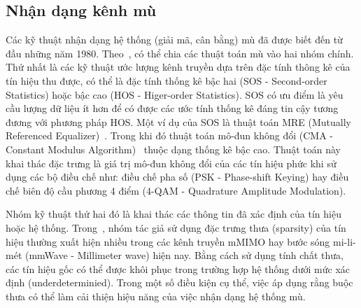\subsection{Nhận dạng kênh mù} \label{sec:blind}

Các kỹ thuật nhận dạng hệ thống (giải mã, cân bằng) mù đã được biết đến từ đầu những năm 1980. Theo~\cite{vilas2022}, có thể chia các thuật toán mù vào hai nhóm chính. Thứ nhất là các kỹ thuật ước lượng kênh truyền dựa trên đặc tính thông kê của tín hiệu thu được, có thể là đặc tính thống kê bậc hai (SOS - Second-order Statistics) hoặc bậc cao (HOS - Higer-order Statistics). 
SOS có ưu điểm là yêu cầu lượng dữ liệu ít hơn để có được các ước tính thống kê đáng tin cậy tương đương với phương pháp HOS. Một ví dụ của SOS là thuật toán MRE (Mutually Referenced Equalizer)~\cite{original}.
Trong khi đó thuật toán mô-đun không đổi (CMA - Constant Modulus Algorithm)~\cite{Treichler1983} thuộc dạng thống kê bậc cao. Thuật toán này khai thác đặc trưng là giá trị mô-đun không đổi của các tín hiệu phức khi sử dụng các bộ điều chế như: điều chế pha số (PSK - Phase-shift Keying) hay điều chế biên độ cầu phương 4 điểm (4-QAM - Quadrature Amplitude Modulation).

Nhóm kỹ thuật thứ hai đó là khai thác các thông tin đã xác định của tín hiệu hoặc hệ thống. Trong~\cite{Bey2011}, nhóm tác giả sử dụng đặc trưng thưa (sparsity) của tín hiệu thường xuất hiện nhiều trong các kênh truyền mMIMO hay bước sóng mi-li-mét (mmWave - Millimeter wave) hiện nay. Bằng cách sử dụng tính chất thưa, các tín hiệu gốc có thể được khôi phục trong trường hợp hệ thống dưới mức xác định (underdeterminied). Trong một số điều kiện cụ thể, việc áp dụng rằng buộc thưa có thể làm cải thiện hiệu năng của việc nhận dạng hệ thống mù.

